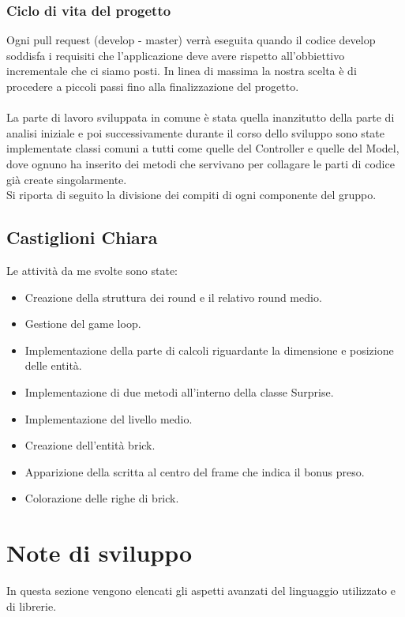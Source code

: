 \documentclass[a4paper,12pt]{report}
\begin{document}
\subsubsection{Ciclo di vita del progetto}
Ogni pull request (develop - master) verrà eseguita quando il codice develop soddisfa i requisiti che l'applicazione deve avere rispetto
all'obbiettivo incrementale che ci siamo posti.
In linea di massima la nostra scelta è di procedere a piccoli passi fino alla finalizzazione del progetto.\\
\\La parte di lavoro sviluppata in comune è stata quella inanzitutto della parte di analisi iniziale e poi successivamente durante il corso dello sviluppo
sono state implementate classi comuni a tutti come quelle del Controller e quelle del Model, dove ognuno ha inserito dei metodi che servivano per collagare
le parti di codice già create singolarmente.
\\Si riporta di seguito la divisione dei compiti di ogni componente del gruppo.
\subsection{Castiglioni Chiara}
Le attività da me svolte sono state:
\begin{itemize}
    \item Creazione della struttura dei round e il relativo round medio.
    \item Gestione del game loop.
    \item Implementazione della parte di calcoli riguardante la dimensione e posizione delle entità.
    \item Implementazione di due metodi all'interno della classe Surprise.
    \item Implementazione del livello medio.
    \item Creazione dell'entità brick.
    \item Apparizione della scritta al centro del frame che indica il bonus preso.
    \item Colorazione delle righe di brick.
\end{itemize}
\section{Note di sviluppo}
In questa sezione vengono elencati gli aspetti avanzati del linguaggio utilizzato e di librerie.
\end{document}
